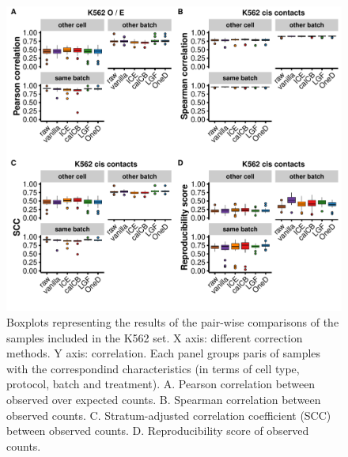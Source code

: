 \documentclass[12pt]{report}
\begin{document}
\begin{figure}
\centerline{\includegraphics[width=\textwidth]{img/correlation_aberrant_boxplots2.pdf}}
\caption{Boxplots representing the results of the pair-wise comparisons of the
	samples included in the K562 set. X axis: different correction methods. Y
    axis: correlation. Each panel groups paris of samples with the correspondind
    characteristics (in terms of cell type, protocol, batch and
    treatment). A. Pearson correlation between observed over expected
    counts. B. Spearman correlation between observed counts. C. Stratum-adjusted correlation
    coefficient (SCC) between observed counts. D. Reproducibility score of
    observed counts.}
\end{figure}
\end{document}
